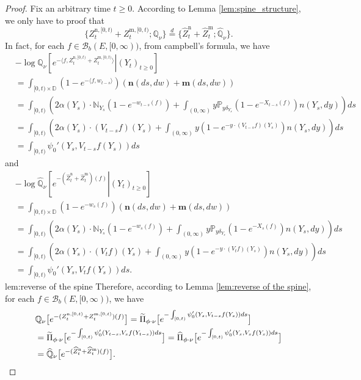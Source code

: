 \documentclass[12pt,a4paper]{amsart}
\numberwithin{equation}{section}
\theoremstyle{plain}
\theoremstyle{definition}
\begin{document}
\begin{proof}
	Fix an arbitrary time $t\geq 0$. According to Lemma \ref{lem:spine_structure}, we only have to proof that
  \[
    \{Z^{\mathrm n,[0,t)}_{t} + Z^{\mathrm m,[0,t)}_{t}; \mathbb Q_\nu\}
    \overset{d}{=}
    \{\widehat Z^{\mathrm n}_{t} + \widehat Z^{\mathrm m}_{t}; \widehat{\mathbb Q}_\nu\}.
  \]
	In fact, for each $f\in \mathcal B_b(E,[0,\infty))$, from campbell's formula, we have
  \begin{align}
    &-\log \mathbb Q_\nu \left [\left. e^{-\langle f, Z^{\mathrm n,[0,t)}_{t} + Z^{\mathrm m,[0,t)}_{t}\rangle}\right |(Y_t)_{t\geq 0}\right]
    \\&= \int_{[0,t)\times \mathbb D} \left(1-e^{- \langle f, w_{t-s}\rangle}\right)\left(\mathbf n(ds,dw) + \mathbf m(ds,dw)\right)
    \\&= \int_{[0,t)} \left(2\alpha(Y_s) \cdot \mathbb N_{Y_s}\left(1-e^{-w_{t-s}(f)}\right) + \int_{(0,\infty)} y \mathbb P_{y\delta_{Y_s}}\left(1-e^{-X_{t-s}(f)}\right)n(Y_s,dy)\right) ds
    \\&= \int_{[0,t)} \left(2\alpha(Y_s) \cdot (V_{t-s}f)(Y_s) + \int_{(0,\infty)} y \left(1-e^{-y\cdot(V_{t-s}f)(Y_s)}\right)n(Y_s,dy)\right) ds
    \\&= \int_{[0,t)} \psi_0'\left( Y_s, V_{t-s}f(Y_s)\right)ds
  \end{align}
	and
  \begin{align}
    &-\log \widehat{\mathbb Q}_\nu \left [\left. e^{-(\widehat Z^{\mathrm n}_{t} + \widehat Z^{\mathrm m}_{t})(f)}\right |(Y_t)_{t\geq 0}\right]
    \\&= \int_{[0,t)\times \mathbb D} \left(1-e^{- w_s(f)}\right)\left(\mathbf n(ds,dw) + \mathbf m(ds,dw)\right)
    \\&= \int_{[0,t)} \left(2\alpha(Y_s) \cdot \mathbb N_{Y_s}\left(1-e^{-w_{s}(f)}\right) + \int_{(0,\infty)} y \mathbb P_{y\delta_{Y_s}}\left(1-e^{-X_{s}(f)}\right)n(Y_s,dy)\right) ds
    \\&= \int_{[0,t)} \left(2\alpha(Y_s) \cdot (V_{t}f)(Y_s) + \int_{(0,\infty)} y \left(1-e^{-y\cdot(V_{t}f)(Y_s)}\right)n(Y_s,dy)\right) ds
    \\&= \int_{[0,t)} \psi_0'\left( Y_s, V_{t}f(Y_s)\right)ds.
  \end{align}
	lem:reverse of the spine
	Therefore, according to Lemma \ref{lem:reverse of the spine}, for each $f\in \mathcal B_b(E,[0,\infty))$, we have
  \begin{align}
  	&\mathbb Q_\nu  \big[e^{-(Z^{\mathrm n,[0,t)}_{t} + Z^{\mathrm m,[0,t)}_{t})(f)}\big]
     = \widetilde \Pi_{\phi\cdot\nu} \big[e^{-\int_{[0,t)} \psi_0'( Y_s, V_{t-s}f(Y_s))ds}\big]
  	\\&= \widetilde \Pi_{\phi\cdot\nu} \big[e^{-\int_{[0,t)} \psi_0'( Y_{t-s}, V_{s}f(Y_{t-s}))ds}\big]
  	= \widehat \Pi_{\phi\cdot\nu} \big[e^{-\int_{[0,t)} \psi_0'( Y_{s}, V_{s}f(Y_{s}))ds}\big]
  	\\&= \widehat{\mathbb Q}_\nu \big [e^{-(\widehat Z^{\mathrm n}_{t} + \widehat Z^{\mathrm m}_{t})(f)}\big].
  	\qedhere
  \end{align}
\end{proof}
\end{document}
